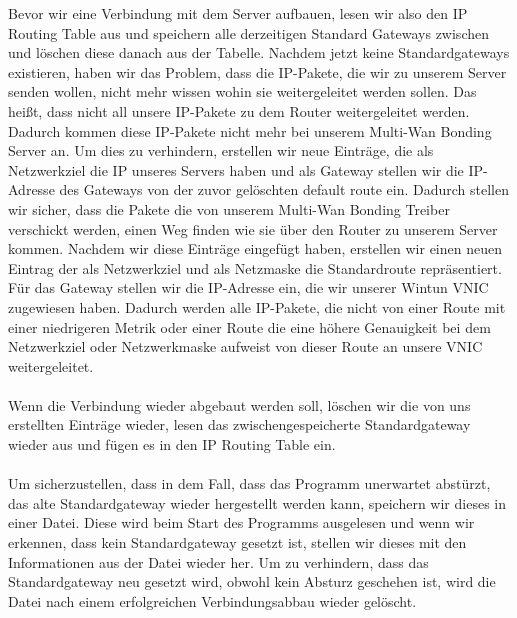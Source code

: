 Bevor wir eine Verbindung mit dem Server aufbauen, lesen wir also den IP Routing Table aus und speichern alle derzeitigen Standard Gateways zwischen und löschen diese danach aus der Tabelle. Nachdem jetzt keine Standardgateways existieren, haben wir das Problem, dass die IP-Pakete, die wir zu unserem Server senden wollen, nicht mehr wissen wohin sie weitergeleitet werden sollen. Das heißt, dass nicht all unsere IP-Pakete zu dem Router weitergeleitet werden. Dadurch kommen diese IP-Pakete nicht mehr bei unserem Multi-Wan Bonding Server an. Um dies zu verhindern, erstellen wir neue Einträge, die als Netzwerkziel die IP unseres Servers haben und als Gateway stellen wir die IP-Adresse des Gateways von der zuvor gelöschten default route ein. Dadurch stellen wir sicher, dass die Pakete die von unserem Multi-Wan Bonding Treiber verschickt werden, einen Weg finden wie sie über den Router zu unserem Server kommen. Nachdem wir diese Einträge eingefügt haben, erstellen wir einen neuen Eintrag der als Netzwerkziel und als Netzmaske die Standardroute repräsentiert. Für das Gateway stellen wir die IP-Adresse ein, die wir unserer Wintun VNIC zugewiesen haben. Dadurch werden alle IP-Pakete, die nicht von einer Route mit einer niedrigeren Metrik oder einer Route die eine höhere Genauigkeit bei dem Netzwerkziel oder Netzwerkmaske aufweist von dieser Route an unsere VNIC weitergeleitet.
\\\\
Wenn die Verbindung wieder abgebaut werden soll, löschen wir die von uns erstellten Einträge wieder, lesen das zwischengespeicherte Standardgateway wieder aus und fügen es in den IP Routing Table ein.
\\\\
Um sicherzustellen, dass in dem Fall, dass das Programm unerwartet abstürzt, das alte Standardgateway wieder hergestellt werden kann, speichern wir dieses in einer Datei. Diese wird beim Start des Programms ausgelesen und wenn wir erkennen, dass kein Standardgateway gesetzt ist, stellen wir dieses mit den Informationen aus der Datei wieder her. Um zu verhindern, dass das Standardgateway neu gesetzt wird, obwohl kein Absturz geschehen ist, wird die Datei nach einem erfolgreichen Verbindungsabbau wieder gelöscht.

